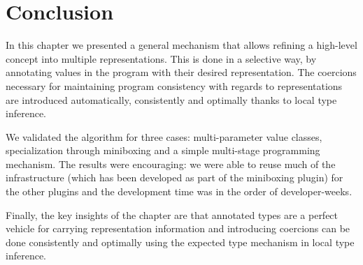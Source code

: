 \section{Conclusion}

In this chapter we presented a general mechanism that allows refining a high-level concept into multiple representations. This is done in a selective way, by annotating  values in the program with their desired representation. The coercions necessary for maintaining program consistency with regards to representations are introduced automatically, consistently and optimally thanks to local type inference.

We validated the algorithm for three cases: multi-pa\-ram\-e\-ter value classes, specialization through miniboxing and a simple multi-stage programming mechanism. The results were encouraging: we were able to reuse much of the infrastructure (which has been developed as part of the miniboxing plugin) for the other plugins and the development time was in the order of developer-weeks.

Finally, the key insights of the chapter are that annotated types are a perfect vehicle for carrying representation information and introducing coercions can be done consistently and optimally using the expected type mechanism in local type inference.

